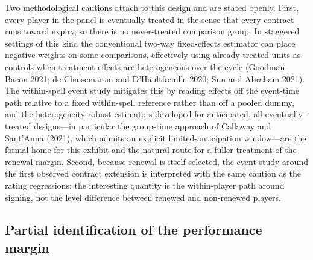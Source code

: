 Two methodological cautions attach to this design and are stated openly. First,
every player in the panel is eventually treated in the sense that every contract
runs toward expiry, so there is no never-treated comparison group. In staggered
settings of this kind the conventional two-way fixed-effects estimator can place
negative weights on some comparisons, effectively using already-treated units as
controls when treatment effects are heterogeneous over the cycle (Goodman-Bacon
2021; de Chaisemartin and D'Haultf\oe uille 2020; Sun and Abraham 2021). The
within-spell event study mitigates this by reading effects off the event-time path
relative to a fixed within-spell reference rather than off a pooled dummy, and the
heterogeneity-robust estimators developed for anticipated, all-eventually-treated
designs---in particular the group-time approach of Callaway and Sant'Anna (2021),
which admits an explicit limited-anticipation window---are the formal home for this
exhibit and the natural route for a fuller treatment of the renewal margin. Second,
because renewal is itself selected, the event study around the first observed
contract extension is interpreted with the same caution as the rating regressions:
the interesting quantity is the within-player path around signing, not the level
difference between renewed and non-renewed players.

\subsection{Partial identification of the performance margin}
\label{sec:strategy-bounds}

